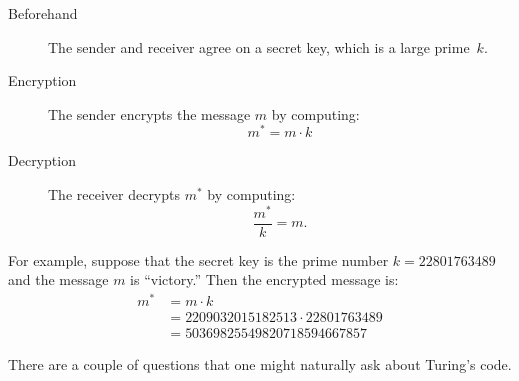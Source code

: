 \begin{description}

\item[Beforehand] The sender and receiver agree on a secret key, which
is a large prime~$k$.

\item[Encryption] The sender encrypts the message $m$ by computing:
\[
m^* = m \cdot k
\]

\item[Decryption] The receiver decrypts $m^*$ by computing:
\[
\frac{m^*}{k}
\iffalse
= \frac{m \cdot k}{k}
\fi
  = m.
\]

\end{description}

For example, suppose that the secret key is the prime number $k =
22801763489$ and the message $m$ is ``victory.''  Then the encrypted
message is:
%
\begin{align*}
m^* & = m \cdot k \\
   & = 2209032015182513 \cdot 22801763489 \\
   & = 50369825549820718594667857
\end{align*}

There are a couple of questions that one might naturally ask about Turing's
code.

